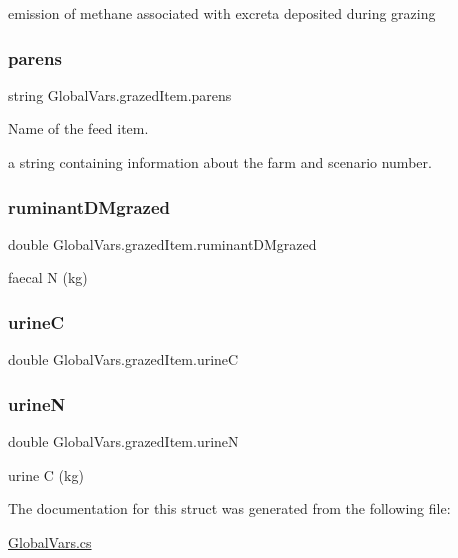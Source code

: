 emission of methane associated with excreta deposited during grazing 

\mbox{\label{struct_global_vars_1_1grazed_item_ad571e8aafded85c7897e3d27d2525ecc}} 
\subsubsection{\texorpdfstring{parens}{parens}}
{\footnotesize\ttfamily string Global\+Vars.\+grazed\+Item.\+parens}



Name of the feed item. 

a string containing information about the farm and scenario number. \mbox{\label{struct_global_vars_1_1grazed_item_ac2c89e55b5d2615210a664cc764817f5}} 
\subsubsection{\texorpdfstring{ruminantDMgrazed}{ruminantDMgrazed}}
{\footnotesize\ttfamily double Global\+Vars.\+grazed\+Item.\+ruminant\+D\+Mgrazed}



faecal N (kg) 

\mbox{\label{struct_global_vars_1_1grazed_item_ac72be9ee6ad98fd1486cc59fc837e456}} 
\subsubsection{\texorpdfstring{urineC}{urineC}}
{\footnotesize\ttfamily double Global\+Vars.\+grazed\+Item.\+urineC}

\mbox{\label{struct_global_vars_1_1grazed_item_ad021d48371c858434dac108952954eb1}} 
\subsubsection{\texorpdfstring{urineN}{urineN}}
{\footnotesize\ttfamily double Global\+Vars.\+grazed\+Item.\+urineN}



urine C (kg) 



The documentation for this struct was generated from the following file\+:\begin{DoxyCompactItemize}
\item 
\mbox{\hyperlink{_global_vars_8cs}{Global\+Vars.\+cs}}\end{DoxyCompactItemize}

